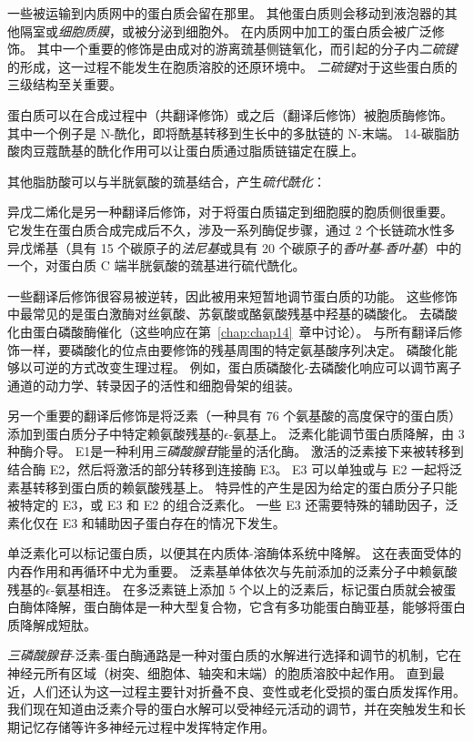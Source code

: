 一些被运输到内质网中的蛋白质会留在那里。
其他蛋白质则会移动到液泡器的其他隔室或\textit{细胞质膜}，或被分泌到细胞外。
在内质网中加工的蛋白质会被广泛修饰。
其中一个重要的修饰是由成对的游离巯基侧链氧化，而引起的分子内\textit{二硫键}的形成，这一过程不能发生在胞质溶胶的还原环境中。
\textit{二硫键}对于这些蛋白质的三级结构至关重要。


蛋白质可以在合成过程中（共翻译修饰）或之后（翻译后修饰）被胞质酶修饰。
其中一个例子是 N-酰化，即将酰基转移到生长中的多肽链的 N-末端。
14-碳脂肪酸肉豆蔻酰基的酰化作用可以让蛋白质通过脂质链锚定在膜上。


其他脂肪酸可以与半胱氨酸的巯基结合，产生\textit{硫代酰化}：

异戊二烯化是另一种翻译后修饰，对于将蛋白质锚定到细胞膜的胞质侧很重要。
它发生在蛋白质合成完成后不久，涉及一系列酶促步骤，通过 2 个长链疏水性多异戊烯基（具有 15 个碳原子的\textit{法尼基}或具有 20 个碳原子的\textit{香叶基}-\textit{香叶基}）中的一个，对蛋白质 C 端半胱氨酸的巯基进行硫代酰化。


一些翻译后修饰很容易被逆转，因此被用来短暂地调节蛋白质的功能。
这些修饰中最常见的是蛋白激酶对丝氨酸、苏氨酸或酪氨酸残基中羟基的磷酸化。
去磷酸化由蛋白磷酸酶催化（这些响应在第~\ref{chap:chap14}~章中讨论）。
与所有翻译后修饰一样，要磷酸化的位点由要修饰的残基周围的特定氨基酸序列决定。
磷酸化能够以可逆的方式改变生理过程。
例如，蛋白质磷酸化-去磷酸化响应可以调节离子通道的动力学、转录因子的活性和细胞骨架的组装。


另一个重要的翻译后修饰是将泛素（一种具有 76 个氨基酸的高度保守的蛋白质）添加到蛋白质分子中特定赖氨酸残基的$\epsilon$-氨基上。
泛素化能调节蛋白质降解，由 3 种酶介导。
E1是一种利用\textit{三磷酸腺苷}能量的活化酶。
激活的泛素接下来被转移到结合酶 E2，然后将激活的部分转移到连接酶 E3。
E3 可以单独或与 E2 一起将泛素基转移到蛋白质的赖氨酸残基上。
特异性的产生是因为给定的蛋白质分子只能被特定的 E3，或 E3 和 E2 的组合泛素化。
一些 E3 还需要特殊的辅助因子，泛素化仅在 E3 和辅助因子蛋白存在的情况下发生。


单泛素化可以标记蛋白质，以便其在内质体-溶酶体系统中降解。
这在表面受体的内吞作用和再循环中尤为重要。
泛素基单体依次与先前添加的泛素分子中赖氨酸残基的$\epsilon$-氨基相连。
在多泛素链上添加 5 个以上的泛素后，标记蛋白质就会被蛋白酶体降解，蛋白酶体是一种大型复合物，它含有多功能蛋白酶亚基，能够将蛋白质降解成短肽。


\textit{三磷酸腺苷}-泛素-蛋白酶通路是一种对蛋白质的水解进行选择和调节的机制，它在神经元所有区域（树突、细胞体、轴突和末端）的胞质溶胶中起作用。
直到最近，人们还认为这一过程主要针对折叠不良、变性或老化受损的蛋白质发挥作用。
我们现在知道由泛素介导的蛋白水解可以受神经元活动的调节，并在突触发生和长期记忆存储等许多神经元过程中发挥特定作用。


